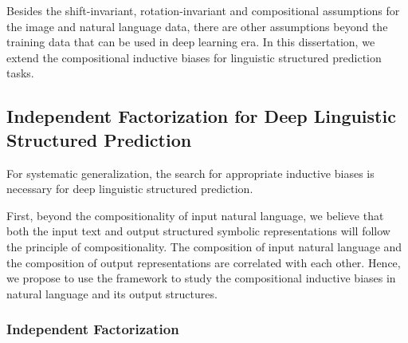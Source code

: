 Besides the shift-invariant, rotation-invariant and compositional
assumptions for the  image and natural language data, there
are other assumptions beyond the training data that can be used in
deep learning era. In this dissertation, we extend the compositional
inductive biases for linguistic structured prediction
tasks.%


%

\subsection[Independent Factorization for Deep Linguistic Structured
  Prediction]{Independent Factorization for Deep Linguistic \\Structured
  Prediction}
\label{ssec:intro:bias-dsp}

For systematic generalization, the search for appropriate inductive
biases is necessary for deep linguistic structured prediction.

First, beyond the compositionality of input natural language, we
believe that both the input text and output structured symbolic
representations will follow the principle of compositionality. The
composition of input natural language and the composition of output
representations are correlated with each other. Hence, we propose to
use the  framework to study the
compositional inductive biases in natural language and its output
structures.

\subsubsection{Independent Factorization}
\label{ssec:intro:ind-factorization}

